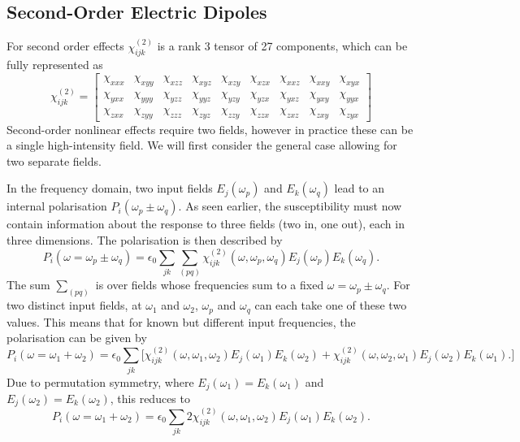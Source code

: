 \subsection{Second-Order Electric Dipoles}\label{sec:background:NonlinearOptics:shgP}
For second order effects $\chi^{(2)}_{ijk}$ is a rank 3 tensor of 27 components, which can be fully represented as
\begin{equation}\label{eq:background:NonlinearOptics:shgP:chiFull}
	\chi^{(2)}_{ijk} =
	\begin{bmatrix}
		\chi_{xxx} & \chi_{xyy} & \chi_{xzz} & \chi_{xyz} & \chi_{xzy} & \chi_{xzx} & \chi_{xxz} & \chi_{xxy} & \chi_{xyx}\\ 
		\chi_{yxx} & \chi_{yyy} & \chi_{yzz} & \chi_{yyz} & \chi_{yzy} & \chi_{yzx} & \chi_{yxz} & \chi_{yxy} & \chi_{yyx}\\ 
		\chi_{zxx} & \chi_{zyy} & \chi_{zzz} & \chi_{zyz} & \chi_{zzy} & \chi_{zzx} & \chi_{zxz} & \chi_{zxy} & \chi_{zyx}
	\end{bmatrix}
\end{equation}
Second-order nonlinear effects require two fields, however in practice these can be a single high-intensity field. We will first consider the general case allowing for two separate fields.

In the frequency domain, two input fields $E_{j}(\omega_{p} )$ and $E_{k}(\omega_{q} )$ lead to an internal polarisation $P_{i}(\omega_{p}\pm\omega_{q} )$. As seen earlier, the susceptibility must now contain information about the response to three fields (two in, one out), each in three dimensions. The polarisation is then described by 
\begin{equation}\label{eq:background:NonlinearOptics:shgP:Psfg}
	P_{i}(\omega=\omega_{p}\pm\omega_{q} ) =  \epsilon_{0} \sum_{jk} \sum_{(pq)}
				\chi^{(2)}_{ijk}(\omega, \omega_{p},\omega_{q} ) 
				E_{j}(\omega_{p} ) E_{k}(\omega_{q} ).
\end{equation}
The sum $\sum_{(pq)}$ is over fields whose frequencies sum to a fixed $\omega=\omega_{p}\pm\omega_{q}$. For two distinct input fields, at $\omega_{1}$ and $\omega_{2}$, $\omega_{p}$ and $\omega_{q}$ can each take one of these two values. This means that for known but different input frequencies, the polarisation can be given by 
\begin{equation}\label{eq:background:NonlinearOptics:shgP:Pw1w2}
	P_{i}(\omega=\omega_{1}+\omega_{2} ) =  \epsilon_{0} \sum_{jk} \big[
				\chi^{(2)}_{ijk}(\omega, \omega_{1},\omega_{2} ) 
				E_{j}(\omega_{1} ) E_{k}(\omega_{2} ) +
				\chi^{(2)}_{ijk}(\omega, \omega_{2},\omega_{1} ) 
				E_{j}(\omega_{2} ) E_{k}(\omega_{1} ).
				\big]
\end{equation}
Due to permutation symmetry, where $E_{j}(\omega_{1} )=E_{k}(\omega_{1} )$ and $E_{j}(\omega_{2} )=E_{k}(\omega_{2} )$, this reduces to~\cite[eq. 1.3.15]{Boyd2008a}
\begin{equation}\label{eq:background:NonlinearOptics:shgP:Pw1w2b}
	P_{i}(\omega=\omega_{1}+\omega_{2} ) =  \epsilon_{0} \sum_{jk}
				2 \chi^{(2)}_{ijk}(\omega, \omega_{1},\omega_{2} ) 
				E_{j}(\omega_{1} ) E_{k}(\omega_{2} ).
\end{equation}

